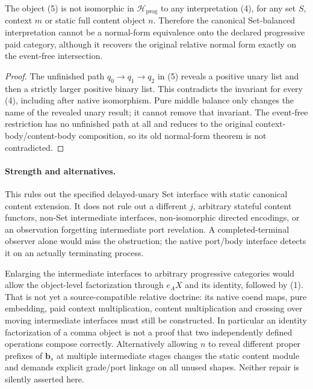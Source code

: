 \documentclass[11pt]{article}\usepackage{amsmath,amssymb,amsthm,geometry}\geometry{margin=1in}
\begin{document}
\begin{theorem}
The object (5) is not isomorphic in $\mathcal H_{\mathrm{prog}}$ to any interpretation (4), for any set $S$, context $m$ or static full content object $n$. Therefore the canonical Set-balanced interpretation cannot be a normal-form equivalence onto the declared progressive paid category, although it recovers the original relative normal form exactly on the event-free intersection.
\end{theorem}
\begin{proof}
The unfinished path $q_0\to q_1\to q_2$ in (5) reveals a positive unary list and then a strictly larger positive binary list. This contradicts the invariant for every (4), including after native isomorphism. Pure middle balance only changes the name of the revealed unary result; it cannot remove that invariant. The event-free restriction has no unfinished path at all and reduces to the original context-body/content-body composition, so its old normal-form theorem is not contradicted.\end{proof}

\paragraph{Strength and alternatives.} This rules out the specified delayed-unary Set interface with static canonical content extension. It does not rule out a different $j$, arbitrary stateful content functors, non-Set intermediate interfaces, non-isomorphic directed encodings, or an observation forgetting intermediate port revelation. A completed-terminal observer alone would miss the obstruction; the native port/body interface detects it on an actually terminating process.

Enlarging the intermediate interfaces to arbitrary progressive categories would allow the object-level factorization through $e_AX$ and its identity, followed by (1). That is not yet a source-compatible relative doctrine: its native coend maps, pure embedding, paid context multiplication, content multiplication and crossing over moving intermediate interfaces must still be constructed. In particular an identity factorization of a comma object is not a proof that two independently defined operations compose correctly. Alternatively allowing $n$ to reveal different proper prefixes of $\mathbf b_s$ at multiple intermediate stages changes the static content module and demands explicit grade/port linkage on all unused shapes. Neither repair is silently asserted here.
\end{document}
